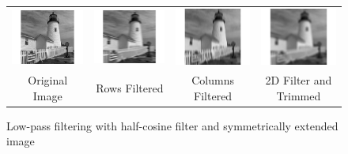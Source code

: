 \documentclass{article}					%
\begin{document}
\begin{figure}[ht!]
\begin{centering}
\begin{tabular}{c c c c}
  \includegraphics{5} & \includegraphics{6} & \includegraphics{7} & \includegraphics{8}\\
  Original Image & Rows Filtered & Columns Filtered & 2D Filter and Trimmed\\
\end{tabular}
\caption{Low-pass filtering with half-cosine filter and symmetrically extended image}
\end{centering}
\end{figure}
\end{document}

